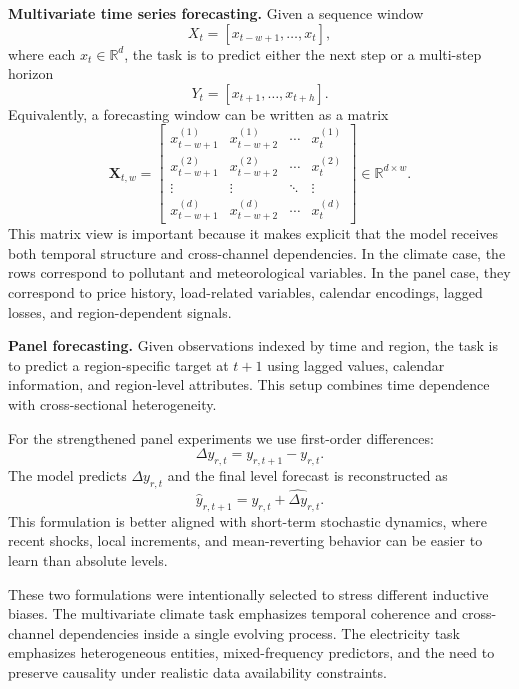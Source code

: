 \documentclass[10pt,conference,onecolumn]{IEEEtran}
\begin{document}
\textbf{Multivariate time series forecasting.} Given a sequence window
\begin{equation}
X_t = [x_{t-w+1}, \dots, x_t],
\end{equation}
where each $x_t \in \mathbb{R}^d$, the task is to predict either the next step or a multi-step horizon
\begin{equation}
Y_t = [x_{t+1}, \dots, x_{t+h}].
\end{equation}
Equivalently, a forecasting window can be written as a matrix
\begin{equation}
\mathbf{X}_{t,w} =
\begin{bmatrix}
x_{t-w+1}^{(1)} & x_{t-w+2}^{(1)} & \cdots & x_t^{(1)} \\
x_{t-w+1}^{(2)} & x_{t-w+2}^{(2)} & \cdots & x_t^{(2)} \\
\vdots & \vdots & \ddots & \vdots \\
x_{t-w+1}^{(d)} & x_{t-w+2}^{(d)} & \cdots & x_t^{(d)}
\end{bmatrix}
\in \mathbb{R}^{d \times w}.
\end{equation}
This matrix view is important because it makes explicit that the model receives both temporal structure and cross-channel dependencies. In the climate case, the rows correspond to pollutant and meteorological variables. In the panel case, they correspond to price history, load-related variables, calendar encodings, lagged losses, and region-dependent signals.

\textbf{Panel forecasting.} Given observations indexed by time and region, the task is to predict a region-specific target at $t+1$ using lagged values, calendar information, and region-level attributes. This setup combines time dependence with cross-sectional heterogeneity.

For the strengthened panel experiments we use first-order differences:
\begin{equation}
\Delta y_{r,t} = y_{r,t+1} - y_{r,t}.
\end{equation}
The model predicts $\Delta y_{r,t}$ and the final level forecast is reconstructed as
\begin{equation}
\hat{y}_{r,t+1} = y_{r,t} + \widehat{\Delta y}_{r,t}.
\end{equation}
This formulation is better aligned with short-term stochastic dynamics, where recent shocks, local increments, and mean-reverting behavior can be easier to learn than absolute levels.

These two formulations were intentionally selected to stress different inductive biases. The multivariate climate task emphasizes temporal coherence and cross-channel dependencies inside a single evolving process. The electricity task emphasizes heterogeneous entities, mixed-frequency predictors, and the need to preserve causality under realistic data availability constraints.
\end{document}
